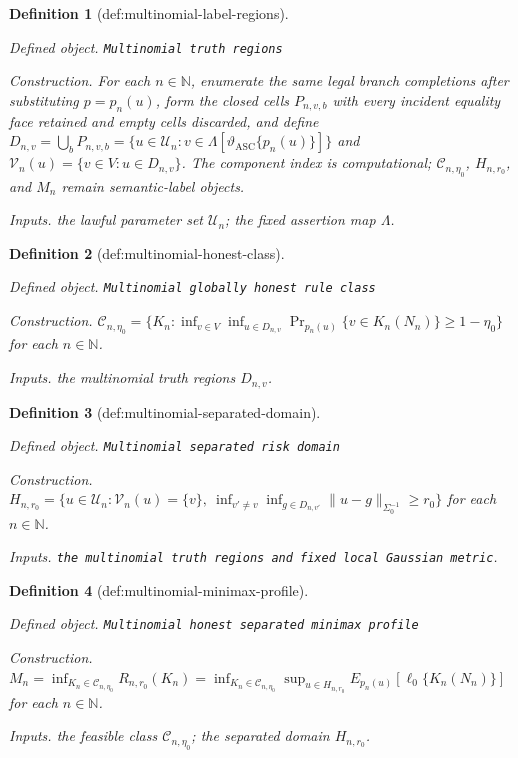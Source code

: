 \documentclass{article}
\newtheorem{definition}{Definition}
\begin{document}
\begin{definition}[def:multinomial-label-regions]\label{def:multinomial-label-regions}
\par\smallskip\noindent\emph{Defined object.} \texttt{Multinomial truth regions}
\par\smallskip\noindent\emph{Construction.} For each \(n\in\mathbb N\), enumerate the same legal branch completions after substituting \(p=p_n(u)\), form the closed cells \(P_{n,v,b}\) with every incident equality face retained and empty cells discarded, and define \(D_{n,v}=\bigcup_bP_{n,v,b}=\{u\in\mathcal U_n:v\in\Lambda[\vartheta_{\mathrm{ASC}}\{p_n(u)\}]\}\) and \(\mathcal V_n(u)=\{v\in V:u\in D_{n,v}\}\). The component index is computational; \(\mathcal C_{n,\eta_0}\), \(H_{n,r_0}\), and \(M_n\) remain semantic-label objects.
\par\smallskip\noindent\emph{Inputs.} the lawful parameter set \(\mathcal U_n\); the fixed assertion map \(\Lambda\).
\end{definition}

\begin{definition}[def:multinomial-honest-class]\label{def:multinomial-honest-class}
\par\smallskip\noindent\emph{Defined object.} \texttt{Multinomial globally honest rule class}
\par\smallskip\noindent\emph{Construction.} \(\mathcal C_{n,\eta_0}=\{K_n:\inf_{v\in V}\inf_{u\in D_{n,v}}\Pr_{p_n(u)}\{v\in K_n(N_n)\}\ge1-\eta_0\}\) for each \(n\in\mathbb N\).
\par\smallskip\noindent\emph{Inputs.} the multinomial truth regions \(D_{n,v}\).
\end{definition}

\begin{definition}[def:multinomial-separated-domain]\label{def:multinomial-separated-domain}
\par\smallskip\noindent\emph{Defined object.} \texttt{Multinomial separated risk domain}
\par\smallskip\noindent\emph{Construction.} \(H_{n,r_0}=\{u\in\mathcal U_n:\mathcal V_n(u)=\{v\},\ \inf_{v'\ne v}\inf_{g\in D_{n,v'}}\|u-g\|_{\Sigma_0^{-1}}\ge r_0\}\) for each \(n\in\mathbb N\).
\par\smallskip\noindent\emph{Inputs.} \texttt{the multinomial truth regions and fixed local Gaussian metric}.
\end{definition}

\begin{definition}[def:multinomial-minimax-profile]\label{def:multinomial-minimax-profile}
\par\smallskip\noindent\emph{Defined object.} \texttt{Multinomial honest separated minimax profile}
\par\smallskip\noindent\emph{Construction.} \(M_n=\inf_{K_n\in\mathcal C_{n,\eta_0}}R_{n,r_0}(K_n)=\inf_{K_n\in\mathcal C_{n,\eta_0}}\sup_{u\in H_{n,r_0}}E_{p_n(u)}[\ell_0\{K_n(N_n)\}]\) for each \(n\in\mathbb N\).
\par\smallskip\noindent\emph{Inputs.} the feasible class \(\mathcal C_{n,\eta_0}\); the separated domain \(H_{n,r_0}\).
\end{definition}
\end{document}
